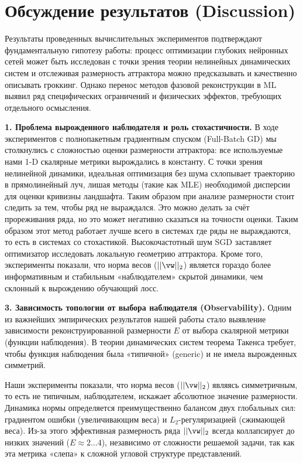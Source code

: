 \documentclass{article}
\begin{document}
\section{Обсуждение результатов (Discussion)}\label{sec:disc}

Результаты проведенных вычислительных экспериментов подтверждают фундаментальную гипотезу работы: процесс оптимизации глубоких нейронных сетей может быть исследован с точки зрения теории нелинейных динамических систем и отслеживая размерность аттрактора можно предсказывать и качественно описывать гроккинг. Однако перенос методов фазовой реконструкции в ML выявил ряд специфических ограничений и физических эффектов, требующих отдельного осмысления.

\textbf{1. Проблема вырожденного наблюдателя и роль стохастичности.} 
В ходе экспериментов с полнопакетным градиентным спуском (Full-Batch GD) мы столкнулись с сложностью оценки размерности аттрактора: все используемые нами 1-D скалярные метрики вырождались в константу. С точки зрения нелинейной динамики, идеальная оптимизация без шума схлопывает траекторию в прямолинейный луч, лишая методы (такие как MLE) необходимой дисперсии для оценки кривизны ландшафта. Таким образом при анализе размерности стоит следить за тем, чтобы ряд не выраждался. Это можно делать за счёт прореживания ряда, но это может негативно сказаться на точности оценки. Таким образом этот метод работает лучше всего в системах где ряды не выраждаются, то есть в системах со стохастикой. Высокочастотный шум SGD заставляет оптимизатор исследовать локальную геометрию аттрактора. Кроме того, эксперименты показали, что норма весов ($||\vw||_2$) является гораздо более информативным и стабильным «наблюдателем» скрытой динамики, чем склонный к вырождению обучающий лосс.

\textbf{3. Зависимость топологии от выбора наблюдателя (Observability).}
Одним из важнейших эмпирических результатов нашей работы стало выявление зависимости реконструированной размерности $E$ от выбора скалярной метрики (функции наблюдения). В теории динамических систем теорема Такенса требует, чтобы функция наблюдения была «типичной» (generic) и не имела вырожденных симметрий.

Наши эксперименты показали, что норма весов ($||\vw||_2$) являясь симметричным, то есть не типичным, наблюдателем, искажает абсолютное значение размерности. Динамика нормы определяется преимущественно балансом двух глобальных сил: градиентом ошибки (увеличивающим веса) и $L_2$-регуляризацией (сжимающей веса). Из-за этого эффективная размерность ряда $||\vw||_2$ всегда коллапсирует до низких значений ($E \approx 2\dots 4$), независимо от сложности решаемой задачи, так как эта метрика «слепа» к сложной угловой структуре представлений.
\end{document}
